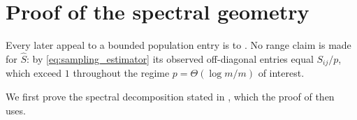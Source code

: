 \section{Proof of the spectral geometry}\label{app:comp1}

\noindent Every later appeal to a bounded population entry is to .
No range claim is made for $\hat S$: by \eqref{eq:sampling_estimator} its observed
off-diagonal entries equal $S_{ij}/p$, which exceed $1$ throughout the regime
$p=\Theta(\log m/m)$ of interest.

\noindent We first prove the spectral decomposition stated in ,
which the proof of  then uses.

